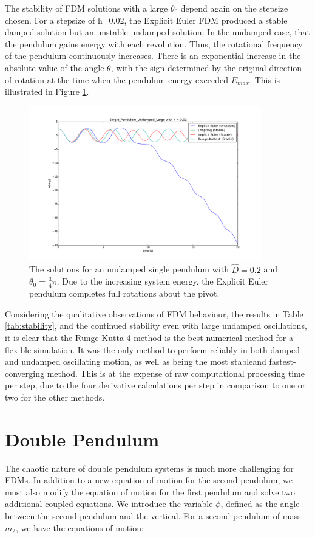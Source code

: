 \documentclass{article}
\begin{document}
The stability of FDM solutions with a large $\theta_{0}$ depend again on the stepsize chosen. For a stepsize of h=0.02, the Explicit Euler FDM produced a stable damped solution but an unstable undamped solution. In the undamped case, that the pendulum gains energy with each revolution. Thus, the rotational frequency of the pendulum continuously increases. There is an exponential increase in the absolute value of the angle $\theta$, with the sign determined by the original direction of rotation at the time when the pendulum energy exceeded $E_{max}$. This is illustrated in Figure
\ref{fig:singledampedbigtheta}. 
\begin{figure}
\begin{center}
\includegraphics[width=0.9\textwidth]{Single_Pendulum_Undamped_Large_Theta}
\caption{The solutions for an undamped single pendulum with $\hat{D}=0.2$ and $\theta_{0} = \frac{3}{4} \pi$. Due to the increasing system energy, the Explicit Euler pendulum completes full rotations about the pivot.}
\label{fig:singledampedbigtheta}
\end{center}
\end{figure}

Considering the qualitative observations of FDM behaviour, the results in Table \ref{tab:stability}, and the continued stability even with large undamped oscillations, it is clear that the Runge-Kutta 4 method is the best numerical method for a flexible simulation. It was the only method to perform reliably in both damped and undamped oscillating motion, as well as being the most stableand fastest-converging method. This is at the expense of raw computational processing time per step, due to the four derivative calculations per step in comparison to one or two for the other methods.
 
\section{Double Pendulum}
The chaotic nature of double pendulum systems is much more challenging for FDMs. In addition to a new equation of motion for the second pendulum, we must also modify the equation of motion for the first pendulum and solve two additional coupled equations. We introduce the variable $\phi$, defined as the angle between the second pendulum and the vertical. For a second pendulum of mass $m_{2}$, we have the equations of motion:
\end{document}
